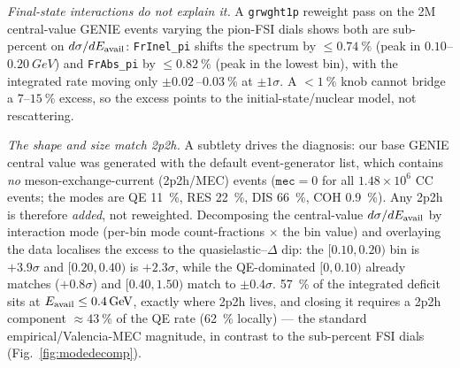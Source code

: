 \emph{Final-state interactions do not explain it.} A \texttt{grwght1p} reweight
pass on the 2M central-value GENIE events varying the pion-FSI dials shows both
are sub-percent on $d\sigma/dE_{\mathrm{avail}}$: \texttt{FrInel\_pi} shifts the spectrum by
$\le\SI{0.74}{\percent}$ (peak in $0.10$--$\SI{0.20}{GeV}$) and \texttt{FrAbs\_pi}
by $\le\SI{0.82}{\percent}$ (peak in the lowest bin), with the integrated rate
moving only $\pm\SI{0.02}{}$--$\SI{0.03}{\percent}$ at $\pm1\sigma$. A
$<\SI{1}{\percent}$ knob cannot bridge a $7$--$\SI{15}{\percent}$ excess, so the
excess points to the initial-state/nuclear model, not rescattering.

\emph{The shape and size match 2p2h.} A subtlety drives the diagnosis: our base
GENIE central value was generated with the default event-generator list, which
contains \emph{no} meson-exchange-current (2p2h/MEC) events
($\texttt{mec}=0$ for all $1.48\times10^{6}$ CC events; the modes are QE
\SI{11}{\percent}, RES \SI{22}{\percent}, DIS \SI{66}{\percent}, COH
\SI{0.9}{\percent}). Any 2p2h is therefore \emph{added}, not reweighted.
Decomposing the central-value $d\sigma/dE_{\mathrm{avail}}$ by interaction mode (per-bin
mode count-fractions $\times$ the bin value) and overlaying the data localises
the excess to the quasielastic--$\Delta$ dip: the $[0.10,0.20)$ bin is
$+3.9\sigma$ and $[0.20,0.40)$ is $+2.3\sigma$, while the QE-dominated
$[0,0.10)$ already matches ($+0.8\sigma$) and $[0.40,1.50)$ match to
$\pm0.4\sigma$. \SI{57}{\percent} of the integrated deficit sits at
$E_{\mathrm{avail}}\le\SI{0.4}{GeV}$, exactly where 2p2h lives, and closing it requires a
2p2h component $\approx\SI{43}{\percent}$ of the QE rate
(\SI{62}{\percent} locally) --- the standard empirical/Valencia-MEC magnitude,
in contrast to the sub-percent FSI dials (Fig.~\ref{fig:modedecomp}).

